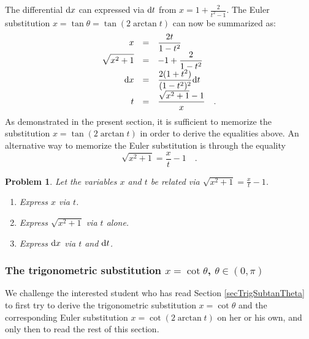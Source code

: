 \documentclass[12pt]{book}
\newtheorem{problem}[theorem]{Problem}
\begin{document}
The differential ${\normalfont \text{d}} x$ can expressed via ${\normalfont \text{d}} t$ from $\displaystyle x=1+ \frac{2 }{t^2 -1}$. The Euler substitution  $x=\tan \theta=\tan (2\arctan t)$ can now be summarized as:
\begin{equation}\label{eqEulerSub1.1}
\begin{array}{rcl}
x&=&\displaystyle \frac{2t}{1-t^2}\\
\displaystyle\sqrt{x^2+1}&=& \displaystyle -1+ \frac{2 }{1-t^2} \\
\displaystyle {\normalfont \text{d}} x&=&\displaystyle \frac{2(1+t^2)} {(1-t^2)^2} {\normalfont \text{d}} t\\
t &=&\displaystyle \frac{\sqrt{x^2+1}-1}{x}\quad .
\end{array}
\end{equation}
As demonstrated in the present section, it is sufficient to memorize the substitution $x=\tan (2\arctan t)$ in order to derive the equalities above. An alternative way to memorize the Euler substitution is through the equality
\[
\sqrt{x^2+1}=\frac{x}{t}-1\quad .
\]
\begin{problem} Let the variables $x$ and $t$ be related via $\sqrt{x^2+1}=\frac{x}{t}-1$.
\begin{enumerate}
\item Express $x$ via $t$.
\item Express $\sqrt{x^2+1}$ via $t$ alone.
\item Express ${\normalfont \text{d}} x$ via $t$ and ${\normalfont \text{d}} t$.
\end{enumerate}
\end{problem}


\subsubsection{The trigonometric substitution $x=\cot \theta$, $\theta \in \left(0, \pi\right)$}
We challenge the interested student who has read Section \ref{secTrigSubtanTheta} to first try to derive the trigonometric substitution $x=\cot \theta$ and the corresponding Euler substitution $x=\cot (2\arctan t)$  on her or his own, and only then to read the rest of this section.
\end{document}
